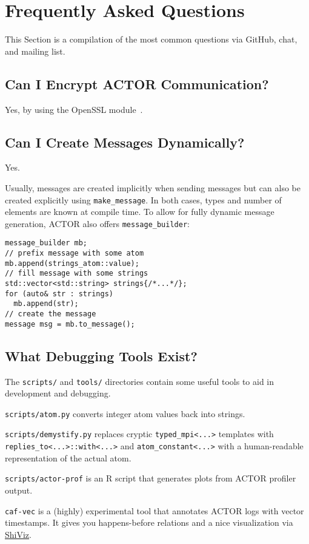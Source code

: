 \section{Frequently Asked Questions}
\label{faq}

This Section is a compilation of the most common questions via GitHub, chat,
and mailing list.

\subsection{Can I Encrypt ACTOR Communication?}

Yes, by using the OpenSSL module~.

\subsection{Can I Create Messages Dynamically?}

Yes.

Usually, messages are created implicitly when sending messages but can also be
created explicitly using \lstinline^make_message^. In both cases, types and
number of elements are known at compile time. To allow for fully dynamic
message generation, ACTOR also offers \lstinline^message_builder^:

\begin{lstlisting}
message_builder mb;
// prefix message with some atom
mb.append(strings_atom::value);
// fill message with some strings
std::vector<std::string> strings{/*...*/};
for (auto& str : strings)
  mb.append(str);
// create the message
message msg = mb.to_message();
\end{lstlisting}

\subsection{What Debugging Tools Exist?}

The \lstinline^scripts/^ and \lstinline^tools/^ directories contain some useful
tools to aid in development and debugging.

\lstinline^scripts/atom.py^ converts integer atom values back into strings.

\lstinline^scripts/demystify.py^ replaces cryptic \lstinline^typed_mpi<...>^
templates with \lstinline^replies_to<...>::with<...>^ and
\lstinline^atom_constant<...>^ with a human-readable representation of the
actual atom.

\lstinline^scripts/actor-prof^ is an R script that generates plots from ACTOR
profiler output.

\lstinline^caf-vec^ is a (highly) experimental tool that annotates ACTOR logs
with vector timestamps. It gives you happens-before relations and a nice
visualization via \href{https://bestchai.bitbucket.io/shiviz/}{ShiViz}.
